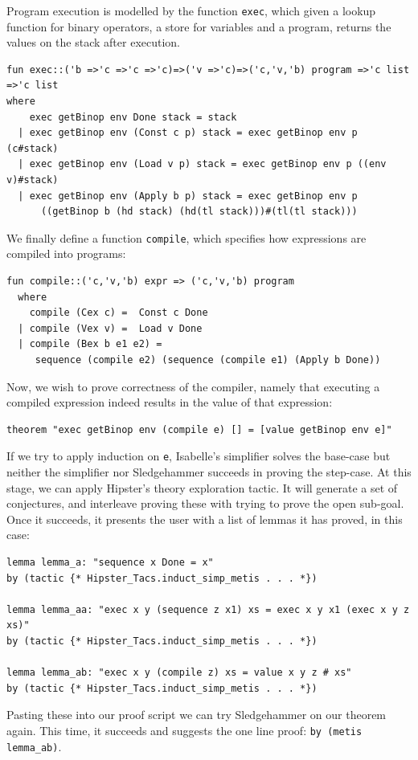 Program execution is modelled by the function \texttt{exec}, which given a lookup function for binary operators, a store for variables and a program, returns the values on the stack after execution.
\begin{verbatim}
fun exec::('b =>'c =>'c =>'c)=>('v =>'c)=>('c,'v,'b) program =>'c list =>'c list
where
    exec getBinop env Done stack = stack
  | exec getBinop env (Const c p) stack = exec getBinop env p (c#stack) 
  | exec getBinop env (Load v p) stack = exec getBinop env p ((env v)#stack)
  | exec getBinop env (Apply b p) stack = exec getBinop env p 
  	  ((getBinop b (hd stack) (hd(tl stack)))#(tl(tl stack)))
\end{verbatim}
We finally define a function \texttt{compile}, which specifies how expressions are compiled into programs:
\begin{verbatim}
fun compile::('c,'v,'b) expr => ('c,'v,'b) program
  where
    compile (Cex c) =  Const c Done
  | compile (Vex v) =  Load v Done
  | compile (Bex b e1 e2) = 
     sequence (compile e2) (sequence (compile e1) (Apply b Done))
\end{verbatim}
Now, we wish to prove correctness of the compiler, namely that executing a compiled expression indeed results in the value of that expression: 
\begin{verbatim}
theorem "exec getBinop env (compile e) [] = [value getBinop env e]"
\end{verbatim}
If we try to apply induction on \texttt{e}, Isabelle's simplifier solves the base-case but neither the simplifier nor Sledgehammer succeeds in proving the step-case. At this stage, we can apply Hipster's theory exploration tactic. It will generate a set of conjectures, and interleave proving these with trying to prove the open sub-goal. Once it succeeds, it presents the user with a list of lemmas it has proved, in this case:
\begin{small}
\begin{verbatim}
lemma lemma_a: "sequence x Done = x"
by (tactic {* Hipster_Tacs.induct_simp_metis . . . *})

lemma lemma_aa: "exec x y (sequence z x1) xs = exec x y x1 (exec x y z xs)"
by (tactic {* Hipster_Tacs.induct_simp_metis . . . *})

lemma lemma_ab: "exec x y (compile z) xs = value x y z # xs"
by (tactic {* Hipster_Tacs.induct_simp_metis . . . *})
\end{verbatim}
\end{small}
Pasting these into our proof script we can try Sledgehammer on our theorem again. This time, it succeeds and suggests the one line proof: \texttt{by (metis lemma\_ab)}.



